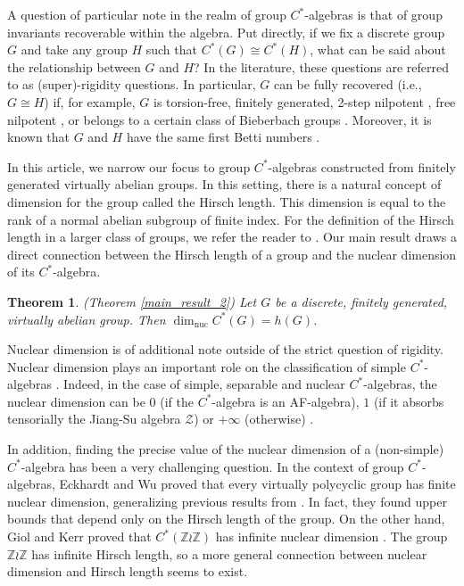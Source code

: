 \documentclass[11pt, twoside]{amsart}
\newcommand{\dimnuc }{\dim_{\operatorname{nuc}}}
\newtheorem{thm}{Theorem}[section]
\theoremstyle{definition}
\newcommand{\B}{\mathbb}
\newcommand{\Z}{\B{Z}}
\newcommand{\ZZ}{\mathcal{Z}}
\begin{document}
 
A question of particular note in the realm of group $C^*$-algebras is that of group invariants recoverable within the algebra. Put directly, if we fix a discrete group $G$ and take any group $H$ such that $C^*(G)\cong C^*(H)$, what can be said about the relationship between $G$ and $H$? In the literature, these questions are referred to as (super)-rigidity questions. In particular, $G$ can be fully recovered (i.e., $G\cong H$) if, for example, $G$ is torsion-free, finitely generated, 2-step nilpotent \cite{tf_2_step_c*_superrigid}, free nilpotent \cite{free_nilp_c*_superrigid}, or belongs to a certain class of Bieberbach groups \cite{Knubyetal}. Moreover, it is known that $G$ and $H$ have the same first Betti numbers \cite{free_nilp_c*_superrigid}. \par

In this article, we narrow our focus to group $C^*$-algebras constructed from finitely generated virtually abelian groups. In this setting, there is a natural concept of dimension for the group called the Hirsch length. This dimension is equal to the rank of a normal abelian subgroup of finite index. For the definition of the Hirsch length in a larger class of groups, we refer the reader to \cite{hillman_finite_Hirsch_length_old}. Our main result draws a direct connection between the Hirsch length of a group and the nuclear dimension of its $C^*$-algebra. 

\begin{thm} (Theorem \ref{main_result_2})
Let $G$ be a discrete, finitely generated, virtually abelian group. Then $\dimnuc C^*(G)=h(G)$.
\end{thm}

Nuclear dimension is of additional note outside of the strict question of rigidity. Nuclear dimension plays an  important role on the classification of simple $C^*$-algebras \cite{GLN1,GLN2,tikuisis2017quasidiagonality,elliot2015quasidiagonality}. Indeed, in the case of simple, separable and nuclear $C^*$-algebras, the nuclear dimension can be $0$ (if the $C^*$-algebra is an AF-algebra), $1$ (if it absorbs tensorially the Jiang-Su algebra $\ZZ$) or $+\infty$ (otherwise) \cite{dim_nuc_simple,dim_nuc_simple_st_proj}. \par

In addition, finding the precise value of the nuclear dimension of a (non-simple) $C^*$-algebra has been a very challenging question. In the context of group $C^*$-algebras, Eckhardt and Wu proved \cite{EW24} that every virtually polycyclic group has finite nuclear dimension, generalizing previous results from \cite{EGM19,EM18}. In fact, they found upper bounds that depend only on the Hirsch length of the group. On the other hand, Giol and Kerr proved that $C^*(\Z \wr \Z)$ has infinite nuclear dimension \cite{GK10}. The group $\Z\wr \Z$ has infinite Hirsch length, so a more general connection between nuclear dimension and Hirsch length seems to exist. \par
\end{document}
